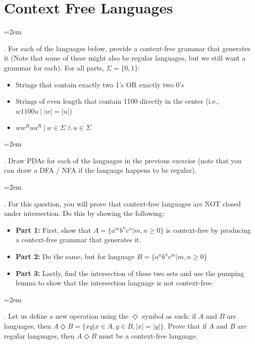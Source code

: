 \documentclass[12pt]{article}
\def\homework{Context Free Languages}
\newcounter{quesnum}
\newcommand{\question}[2][??]{
\begin{list}{\labelitemi}{\leftmargin=2em}
\item [\arabic{quesnum}.] {} {#2}
\end{list}
\addtocounter{quesnum}{1}
}
\begin{document}
\section*{\homework}


\question[3]{
For each of the languages below, provide a context-free grammar that generates it (Note that some of these might also be regular languages, but we still want a grammar for each). For all parts, $\Sigma=\{0,1\}$:
}

\begin{itemize}
	\item Strings that contain exactly two 1's OR exactly two 0's
	\item Strings of even length that contain 1100 directly in the center (i.e., $w1100u \ | \ |w|=|u|$)
	\item $ww^Ruu^R \ | \ w \in \Sigma \wedge u \in \Sigma$
\end{itemize}

\vspace{12pt}

\question[3]{
Draw PDAs for each of the languages in the previous exercise (note that you can draw a DFA / NFA if the language happens to be regular).
}

\vspace{12pt}

\question[3]{
For this question, you will prove that context-free languages are NOT closed under intersection. Do this by showing the following:
}

\begin{itemize}
	\item \textbf{Part 1:} First, show that $A=\{a^mb^nc^n | m,n \geq 0\}$ is context-free by producing a context-free grammar that generates it.
	\item \textbf{Part 2:} Do the same, but for language $B=\{a^nb^nc^m | m,n \geq 0\}$
	\item \textbf{Part 3:} Lastly, find the intersection of these two sets and use the pumping lemma to show that the intersection language is not context-free.
\end{itemize}

\vspace{12pt}



\question[3]{
Let us define a new operation using the $\Diamond$ symbol as such: if $A$ and $B$ are languages, then $A \Diamond B = \{xy | x \in A, y \in B, |x|=|y| \}$. Prove that if $A$ and $B$ are regular languages, then $A \Diamond B$ must be a context-free language.
}
\end{document}
